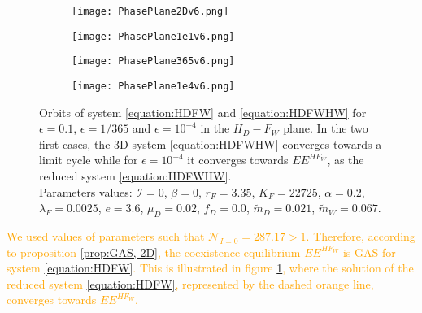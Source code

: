 \documentclass{article}
\newcommand{\lfw}{\lambda_{F}}
\newcommand{\lfw}{\lambda_{F}}
\newcommand{\cI}{\mathcal{I}}
\newcommand{\mW}{\tilde{m}_W}
\newcommand{\mD}{\tilde{m}_D}
\newcommand{\vdeux}[1]{\textcolor{orange}{#1}}
\theoremstyle{definition}
\theoremstyle{remark}
\begin{document}
\vspace{0.1cm}
\begin{figure}[!h]
\centering
\begin{subfigure}{0.45\textwidth}
\centering
\texttt{[image: PhasePlane2Dv6.png]}
\caption{}
\label{fig:comparison 2D-3D, a}
\end{subfigure}
\begin{subfigure}{0.45\textwidth}
\centering
\texttt{[image: PhasePlane1e1v6.png]}
\caption{}
\label{fig:comparison 2D-3D, b}
\end{subfigure}
\begin{subfigure}{0.45\textwidth}
\centering
\texttt{[image: PhasePlane365v6.png]}
\caption{}
\label{fig:comparison 2D-3D, c}
\end{subfigure}
\begin{subfigure}{0.45\textwidth}
\centering
\texttt{[image: PhasePlane1e4v6.png]}
\caption{}
\label{fig:comparison 2D-3D, d}
\end{subfigure}
\caption{Orbits of system \eqref{equation:HDFW} and \eqref{equation:HDFWHW} for $\epsilon = 0.1$, $\epsilon = 1/365$ and $\epsilon = 10^{-4}$ in the $H_D - F_W$ plane. In the two first cases, the 3D system \eqref{equation:HDFWHW} converges towards a limit cycle while for $\epsilon = 10^{-4}$ it converges towards $EE^{HF_W}$, as the reduced system \eqref{equation:HDFWHW}. \\
Parameters values: $\cI = 0$, $\beta = 0$, $r_F = 3.35$, $K_F = 22725$, $\alpha = 0.2$, $\lfw = 0.0025$, $e = 3.6$, $\mu_D = 0.02$, $f_D = 0.0$, $\mD = 0.021$, $\mW = 0.067$.}
\label{fig:comparison 2D-3D}
\end{figure}


\vdeux{
We used values of parameters such that $\mathcal{N}_{I=0}=287.17 > 1$. Therefore, according to proposition \ref{prop:GAS, 2D}, the coexistence equilibrium $EE^{HF_W}$ is GAS for system \eqref{equation:HDFW}. This is illustrated in figure \ref{fig:comparison 2D-3D, a}, where the solution of the reduced system \eqref{equation:HDFW}, represented by the dashed orange line, converges towards $EE^{HF_W}$.}
\end{document}
